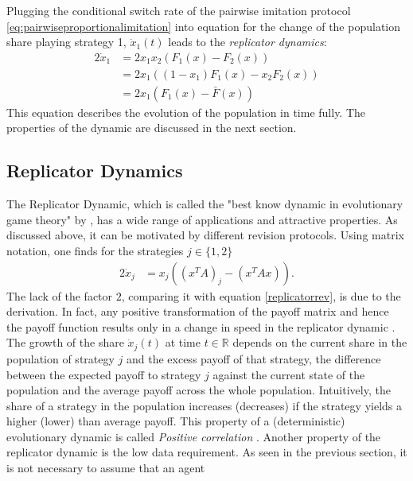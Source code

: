 \documentclass[11pt]{article}
\newcommand{\realnumb}{\mathbb{R}}
\begin{document}
Plugging the conditional switch rate of the pairwise imitation protocol 
\eqref{eq:pairwiseproportionalimitation} into equation for the change 
of the population share playing strategy 1, $\dot{x}_1(t)$ leads to the 
\textit{replicator dynamics}:
\begin{alignat*}{2}
        \label{replicatorrev}
        \dot{x}_1 &= 2 x_1 x_2 (F_1(x) - F_2(x)) \\
                  &= 2 x_1 ((1-x_1) F_1(x) - x_2 F_2(x)) \\
                  &= 2 x_1 (F_1(x) - \bar{F}(x)) 
\end{alignat*}
This equation describes the evolution of the population in time fully. The
properties of the dynamic are discussed in the next section.

\subsection{Replicator Dynamics}
\label{sec:replicatordynamic}
The Replicator Dynamic, which is called the "best know dynamic in
evolutionary game theory" by \textcite{sandholm_population_2010}, has a wide 
range of applications and attractive properties. As discussed above, it can be 
motivated by different revision protocols. Using matrix notation, one finds 
for the strategies $j \in \{1,2\}$
\begin{alignat}{2}
        \dot{x}_j &= x_j\left(\left(x^T A\right)_j - \left(x^T A x\right)\right) 
        \label{eq:replicator}.
\end{alignat}
The lack of the factor $2$, comparing it with equation 
\eqref{replicatorrev}, is due to the derivation. In fact, any
positive transformation of the payoff matrix and hence the payoff function
results only in a change in speed in the replicator dynamic
\parencite[73]{weibull_evolutionary_1997}.
The growth of the share $\dot{x}_j(t)$ at time $t \in \realnumb$ depends 
on the current share in the population of strategy $j$ and the 
excess payoff of that strategy, the difference between the expected 
payoff to strategy $j$ against the current state of the population and the
average payoff across the whole population.
Intuitively, the share of a strategy in the population increases (decreases) 
if the strategy yields a higher (lower) than average payoff. 
This property of a (deterministic) evolutionary dynamic is called 
\textit{Positive correlation} \parencite{sandholm_population_2010}.
Another property of the replicator dynamic is the low data requirement. As 
seen in the previous section, it is not necessary to assume that an agent
\end{document}
